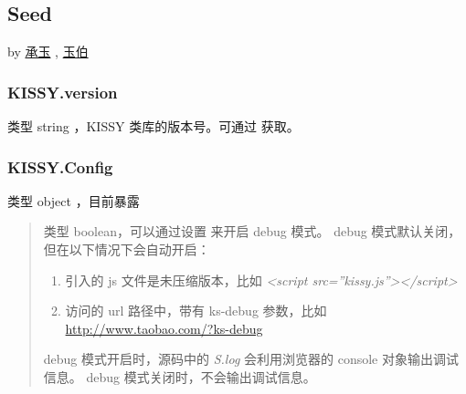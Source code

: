 \documentclass[letterpaper,10pt,english]{sphinxmanual}
\begin{document}
\subsection{Seed}
\label{api/seed/kissy/index:seed}\label{api/seed/kissy/index::doc}
by \href{mailto:yiminghe@gmail.com}{承玉} , \href{mailto:lifesinger@gmail.com}{玉伯}


\subsubsection{KISSY.version}
\label{api/seed/kissy/version:kissy-version}\label{api/seed/kissy/version::doc}

\begin{fulllineitems}
\label{api/seed/kissy/version:Seed.KISSY.version}
类型 string ，KISSY 类库的版本号。可通过  获取。

\end{fulllineitems}



\subsubsection{KISSY.Config}
\label{api/seed/kissy/Config::doc}\label{api/seed/kissy/Config:kissy-config}

\begin{fulllineitems}
\label{api/seed/kissy/Config:Seed.KISSY.Config}
类型 object ，目前暴露
\begin{quote}


\begin{fulllineitems}
\label{api/seed/kissy/Config:Seed.KISSY.Config.debug}
类型 boolean，可以通过设置  来开启 debug 模式。
debug 模式默认关闭，但在以下情况下会自动开启：
\begin{enumerate}
\item {}
引入的 js 文件是未压缩版本，比如 \emph{\textless{}script src=''kissy.js''\textgreater{}\textless{}/script\textgreater{}}

\item {}
访问的 url 路径中，带有 ks-debug 参数，比如 \href{http://www.taobao.com/?ks-debug}{http://www.taobao.com/?ks-debug}

\end{enumerate}

debug 模式开启时，源码中的 \emph{S.log} 会利用浏览器的 console 对象输出调试信息。
debug 模式关闭时，不会输出调试信息。

\end{fulllineitems}

\end{quote}

\end{fulllineitems}
\end{document}

